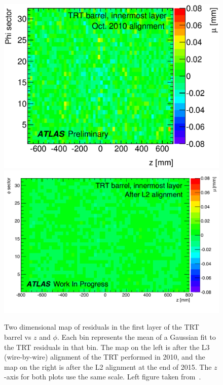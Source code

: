 \begin{figure}[htbp]
  \centering
  \includegraphics[height=.25\textheight]{figs/alignment/trt/TRT_barrel_ResMaps_Oct10}
  \includegraphics[height=.25\textheight]{figs/alignment/trt/trt_b_aveResVsPhiZ_l0_compare}
  \caption[Two dimensional map of residuals in the first layer of the TRT barrel vs $z$ and $\phi$.  Each bin represents the mean of a Gaussian fit to the TRT residuals in that bin.  The map on the left is after the L3 (wire-by-wire) alignment of the TRT performed in 2010, and the map on the right is after the L2 alignment at the end of 2015.  The $z$-axis for both plots use the same scale.]{Two dimensional map of residuals in the first layer of the TRT barrel vs $z$ and $\phi$.  Each bin represents the mean of a Gaussian fit to the TRT residuals in that bin.  The map on the left is after the L3 (wire-by-wire) alignment of the TRT performed in 2010, and the map on the right is after the L2 alignment at the end of 2015.  The $z$-axis for both plots use the same scale.  Left figure taken from~\cite{2011.alignment-7tev}.}
  \label{fig:align_trt_map}
\end{figure}
